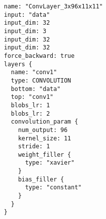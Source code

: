 \begin{verbatim}
name: "ConvLayer_3x96x11x11"
input: "data"
input_dim: 32
input_dim: 3
input_dim: 32
input_dim: 32
force_backward: true
layers {
  name: "conv1"
  type: CONVOLUTION
  bottom: "data"
  top: "conv1"
  blobs_lr: 1
  blobs_lr: 2
  convolution_param {
    num_output: 96
    kernel_size: 11
    stride: 1
    weight_filler {
      type: "xavier"
    }
    bias_filler {
      type: "constant"
    }
  }
}
\end{verbatim}

